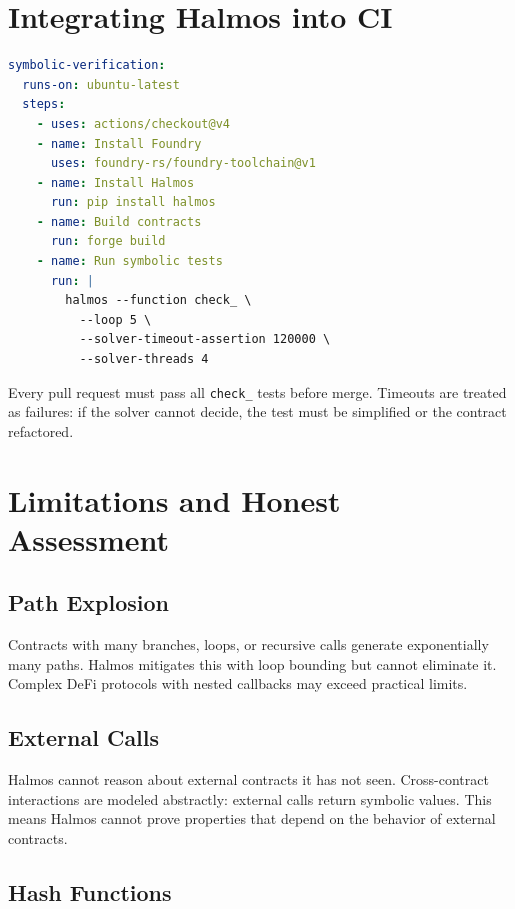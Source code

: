 \documentclass[11pt,a4paper]{article}
\begin{document}
\section{Integrating Halmos into CI}

\begin{lstlisting}[language=YAML,caption={CI configuration for Halmos symbolic tests}]
symbolic-verification:
  runs-on: ubuntu-latest
  steps:
    - uses: actions/checkout@v4
    - name: Install Foundry
      uses: foundry-rs/foundry-toolchain@v1
    - name: Install Halmos
      run: pip install halmos
    - name: Build contracts
      run: forge build
    - name: Run symbolic tests
      run: |
        halmos --function check_ \
          --loop 5 \
          --solver-timeout-assertion 120000 \
          --solver-threads 4
\end{lstlisting}

Every pull request must pass all \texttt{check\_} tests before merge. Timeouts are
treated as failures: if the solver cannot decide, the test must be simplified or the
contract refactored.

\section{Limitations and Honest Assessment}

\subsection{Path Explosion}

Contracts with many branches, loops, or recursive calls generate exponentially many paths.
Halmos mitigates this with loop bounding but cannot eliminate it. Complex DeFi protocols
with nested callbacks may exceed practical limits.

\subsection{External Calls}

Halmos cannot reason about external contracts it has not seen. Cross-contract interactions
are modeled abstractly: external calls return symbolic values. This means Halmos cannot
prove properties that depend on the behavior of external contracts.

\subsection{Hash Functions}
\end{document}

